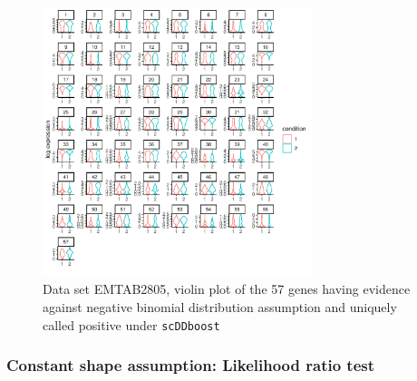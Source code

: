 \documentclass[aoas,preprint]{imsart}
\begin{document}
\begin{figure}[h]
\includegraphics[width = 0.7\textwidth]{Figs/NBgene.pdf}
\caption{Data set EMTAB2805, violin plot of the 57 genes having evidence against negative binomial distribution assumption and uniquely called positive under \texttt{scDDboost}}
\label{fig:s11}
\end{figure}






\subsubsection{Constant shape assumption: Likelihood ratio test}
\end{document}
